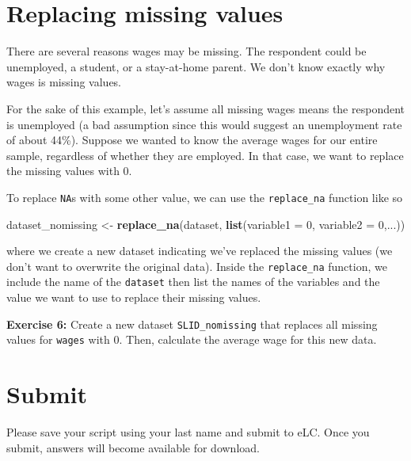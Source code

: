 \documentclass[
]{book}
\newenvironment{Shaded}{\begin{snugshade}}{\end{snugshade}}
\newcommand{\DataTypeTok}[1]{\textcolor[rgb]{0.13,0.29,0.53}{#1}}
\newcommand{\DecValTok}[1]{\textcolor[rgb]{0.00,0.00,0.81}{#1}}
\newcommand{\KeywordTok}[1]{\textcolor[rgb]{0.13,0.29,0.53}{\textbf{#1}}}
\newcommand{\NormalTok}[1]{#1}
\newcommand{\StringTok}[1]{\textcolor[rgb]{0.31,0.60,0.02}{#1}}
\newenvironment{learncheck}%
{%
  \par\vspace{\baselineskip}\noindent 
  \color{Exercise}\begin{itshape}%
  \par\vspace{\baselineskip}\noindent\ignorespaces 
}%
{%
  \end{itshape}\ignorespacesafterend 
}
\begin{document}
\hypertarget{replacing-missing-values}{%
\section{Replacing missing values}\label{replacing-missing-values}}

There are several reasons wages may be missing. The respondent could be unemployed, a student, or a stay-at-home parent. We don't know exactly why wages is missing values.

For the sake of this example, let's assume all missing wages means the respondent is unemployed (a bad assumption since this would suggest an unemployment rate of about 44\%). Suppose we wanted to know the average wages for our entire sample, regardless of whether they are employed. In that case, we want to replace the missing values with 0.

To replace \texttt{NA}s with some other value, we can use the \texttt{replace\_na} function like so

\begin{Shaded}
\begin{Highlighting}[]
\NormalTok{dataset_nomissing <-}\StringTok{ }\KeywordTok{replace_na}\NormalTok{(dataset, }\KeywordTok{list}\NormalTok{(}\DataTypeTok{variable1 =} \DecValTok{0}\NormalTok{, }\DataTypeTok{variable2 =} \DecValTok{0}\NormalTok{,...))}
\end{Highlighting}
\end{Shaded}

where we create a new dataset indicating we've replaced the missing values (we don't want to overwrite the original data). Inside the \texttt{replace\_na} function, we include the name of the \texttt{dataset} then list the names of the variables and the value we want to use to replace their missing values.

\begin{learncheck}
\textbf{Exercise 6:} Create a new dataset \texttt{SLID\_nomissing} that
replaces all missing values for \texttt{wages} with 0. Then, calculate
the average wage for this new data.
\end{learncheck}

\hypertarget{submit}{%
\section{Submit}\label{submit}}

Please save your script using your last name and submit to eLC. Once you submit, answers will become available for download.
\end{document}
